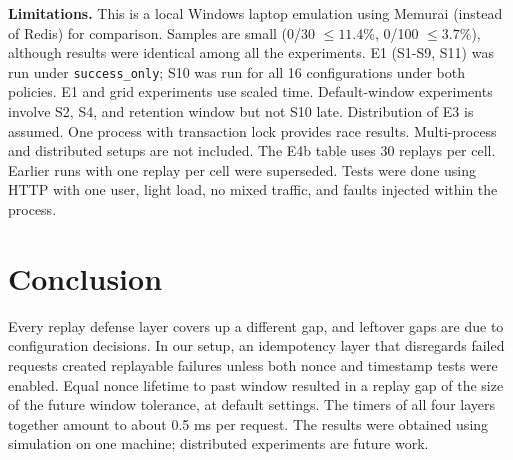 \documentclass[conference]{IEEEtran}
\newcommand{\so}{\texttt{success\_only}}
\begin{document}
\textbf{Limitations.} This is a local Windows laptop emulation using Memurai (instead of Redis) for comparison. Samples are small (0/30 $\leq 11.4\%$, 0/100 $\leq 3.7\%$), although results were identical among all the experiments. E1 (S1-S9, S11) was run under \so{}; S10 was run for all 16 configurations under both policies. E1 and grid experiments use scaled time. Default-window experiments involve S2, S4, and retention window but not S10 late. Distribution of E3 is assumed. One process with transaction lock provides race results. Multi-process and distributed setups are not included. The E4b table uses 30 replays per cell. Earlier runs with one replay per cell were superseded. Tests were done using HTTP with one user, light load, no mixed traffic, and faults injected within the process.

\section{Conclusion}\label{sec:concl}
Every replay defense layer covers up a different gap, and leftover gaps are due to configuration decisions. In our setup, an idempotency layer that disregards failed requests created replayable failures unless both nonce and timestamp tests were enabled. Equal nonce lifetime to past window resulted in a replay gap of the size of the future window tolerance, at default settings. The timers of all four layers together amount to about 0.5 ms per request. The results were obtained using simulation on one machine; distributed experiments are future work.
\end{document}
